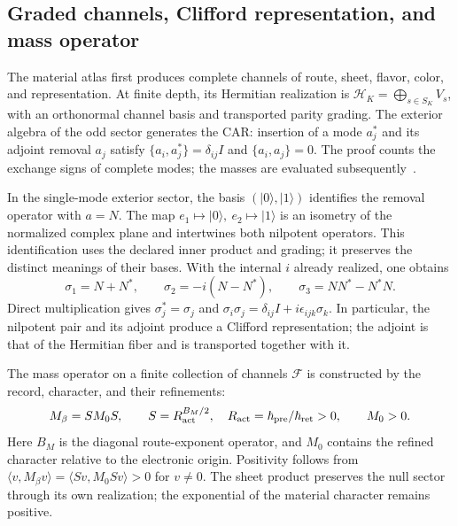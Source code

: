 \subsection{Graded channels, Clifford representation, and mass operator}

The material atlas first produces complete channels of route, sheet, flavor,
color, and representation. At finite depth, its Hermitian
realization is \(\mathcal H_K=\bigoplus_{s\in S_K}V_s\), with an
orthonormal channel basis and transported parity grading. The exterior
algebra of the odd sector generates the CAR: insertion of a mode
\(a_j^*\) and its adjoint removal \(a_j\) satisfy
\(\{a_i,a_j^*\}=\delta_{ij}I\) and \(\{a_i,a_j\}=0\).
The proof counts the exchange signs of complete modes; the masses
are evaluated subsequently~\cite{hmtVI}.

In the single-mode exterior sector, the basis \((|0\rangle,|1\rangle)\)
identifies the removal operator with
\(a=N\). The map \(e_1\mapsto|0\rangle,\ e_2\mapsto|1\rangle\)
is an isometry of the normalized complex plane and intertwines both
nilpotent operators. This identification uses the declared inner product and
grading; it preserves the distinct meanings of their bases.
With the internal \(i\) already realized, one obtains
\begin{equation}
 \sigma_1=N+N^*,\qquad
 \sigma_2=-i(N-N^*),\qquad
 \sigma_3=NN^*-N^*N.
 \label{eq:hc-pauli}
\end{equation}
Direct multiplication gives
\(\sigma_j^*=\sigma_j\) and
\(\sigma_i\sigma_j=\delta_{ij}I+i\epsilon_{ijk}\sigma_k\).
In particular, the nilpotent pair and its adjoint produce a
Clifford representation; the adjoint is that of the Hermitian fiber and
is transported together with it.

The mass operator on a finite collection of channels \(\mathcal F\)
is constructed by the record, character, and their refinements:
\begin{equation}
 M_\beta=S M_0 S,\qquad
 S=R_{\rm act}^{B_M/2},\quad
 R_{\rm act}=\hbar_{\rm pre}/\hbar_{\rm ret}>0,
 \qquad M_0>0.
 \label{eq:hc-mass}
\end{equation}
Here \(B_M\) is the diagonal route-exponent operator, and \(M_0\)
contains the refined character relative to the electronic origin.
Positivity follows from \(\langle v,M_\beta v\rangle
=\langle Sv,M_0Sv\rangle>0\) for \(v\ne0\).
The sheet product preserves the null sector through its own realization;
the exponential of the material character remains positive.

